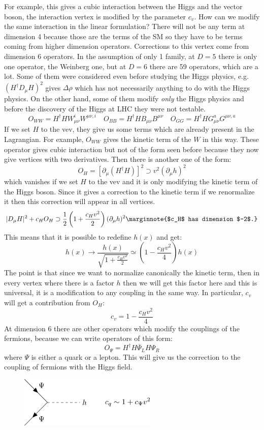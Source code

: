 \documentclass[../main.tex]{subfiles}
\begin{document}
For example, this gives a cubic interaction between the Higgs and the vector boson, the interaction vertex is modified by the parameter $c_v$. How can we modify the same interaction in the linear formulation? There will not be any term at dimension 4 because those are the terms of the SM so they have to be terms coming from higher dimension operators. Corrections to this vertex come from dimension 6 operators. In the assumption of only 1 family, at $D=5$ there is only one operator, the Weinberg one, but at $D=6$ there are 59 operators, which are a lot. Some of them were considered even before studying the Higgs physics, e.g. $(H^\dagger D_\mu H)^2$ gives $\Delta\rho$ which has not necessarily anything to do with the Higgs physics. On the other hand, some of them modify \textit{only} the Higgs physics and before the discovery of the Higgs at LHC they were not testable.
\[
O_{WW}=H^\dagger HW_{\mu\nu}^iW^{\mu\nu,i} \quad O_{BB}=H^\dagger HB_{\mu\nu}B^{\mu\nu} \quad O_{GG}=H^\dagger HG_{\mu\nu}^aG^{\mu\nu,a}
\]
If we set $H$ to the vev, they give us some terms which are already present in the Lagrangian. For example, $O_{WW}$ gives the kinetic term of the $W$ in this way. These operator gives cubic interaction but not of the form seen before because they now give vertices with two derivatives.
Then there is another one of the form:
\[
O_H=[\partial_\mu(H^\dagger H)]^2\supset v^2(\partial_\mu h)^2
\]
which vanishes if we set $H$ to the vev and it is only modifying the kinetic term of the Higgs boson. Since it gives a correction to the kinetic term if we renormalize it then this correction will appear in all vertices.
\[
|D_\mu H|^2+c_HO_H\supset\frac{1}{2}\left(1+\frac{c_Hv^2}{2}\right)(\partial_\mu h)^2\marginnote{$c_H$ has dimension $-2$.}
\]
This means that it is possible to redefine $h(x)$ and get:
\[
h(x)\to\frac{h(x)}{\sqrt{1+\frac{c_Hv^2}{2}}}\simeq\left(1-\frac{c_Hv^2}{4}\right)h(x)
\]
The point is that since we want to normalize canonically the kinetic term, then in every vertex where there is a factor $h$ then we will get this factor here and this is universal, it is a modification to any coupling in the same way. In particular, $c_v$ will get a contribution from $O_H$:
\[
c_v=1-\frac{c_Hv^2}{4}
\]
At dimension 6 there are other operators which modify the couplings of the fermions, because we can write operators of this form:
\[
O_\Psi=H^\dagger H\overline{\Psi}_LH\Psi_R
\]
where $\Psi$ is either a quark or a lepton. This will give us the correction to the coupling of fermions with the Higgs field.
\begin{figure}[h]
    \centering
    \includegraphics[width=0.6\textwidth]{Images/cq.pdf}
    \caption*{}
\end{figure}\\
\end{document}
